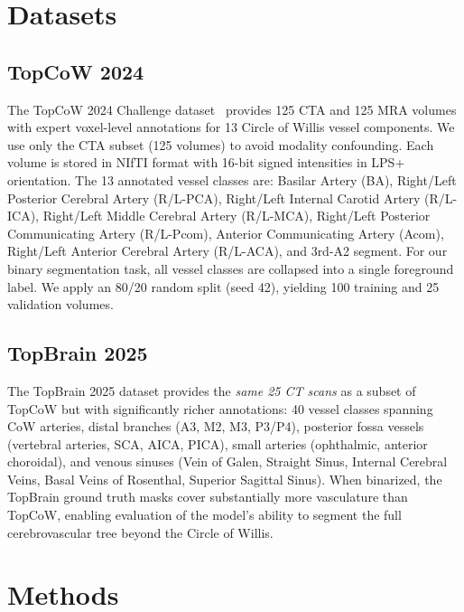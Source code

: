 \documentclass[conference]{IEEEtran}
\begin{document}
\section{Datasets}

\subsection{TopCoW 2024}

The TopCoW 2024 Challenge dataset~\cite{yang2023} provides 125 CTA and 125 MRA volumes with expert voxel-level annotations for 13 Circle of Willis vessel components. We use only the CTA subset (125 volumes) to avoid modality confounding. Each volume is stored in NIfTI format with 16-bit signed intensities in LPS+ orientation. The 13 annotated vessel classes are: Basilar Artery (BA), Right/Left Posterior Cerebral Artery (R/L-PCA), Right/Left Internal Carotid Artery (R/L-ICA), Right/Left Middle Cerebral Artery (R/L-MCA), Right/Left Posterior Communicating Artery (R/L-Pcom), Anterior Communicating Artery (Acom), Right/Left Anterior Cerebral Artery (R/L-ACA), and 3rd-A2 segment. For our binary segmentation task, all vessel classes are collapsed into a single foreground label. We apply an 80/20 random split (seed 42), yielding 100 training and 25 validation volumes.

\subsection{TopBrain 2025}

The TopBrain 2025 dataset provides the \emph{same 25 CT scans} as a subset of TopCoW but with significantly richer annotations: 40 vessel classes spanning CoW arteries, distal branches (A3, M2, M3, P3/P4), posterior fossa vessels (vertebral arteries, SCA, AICA, PICA), small arteries (ophthalmic, anterior choroidal), and venous sinuses (Vein of Galen, Straight Sinus, Internal Cerebral Veins, Basal Veins of Rosenthal, Superior Sagittal Sinus). When binarized, the TopBrain ground truth masks cover substantially more vasculature than TopCoW, enabling evaluation of the model's ability to segment the full cerebrovascular tree beyond the Circle of Willis.

\section{Methods}
\end{document}
